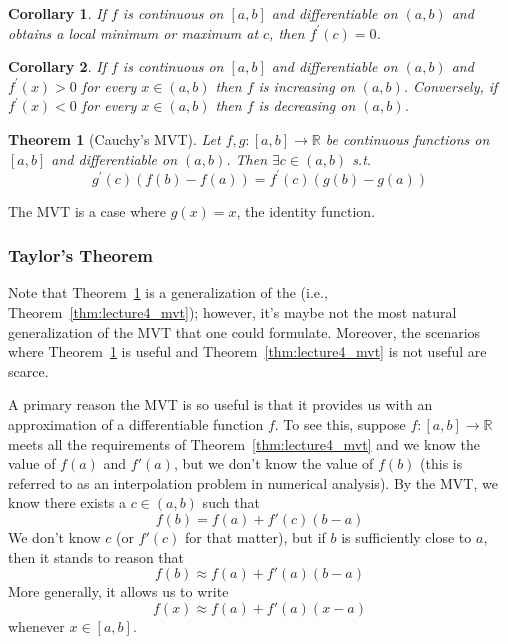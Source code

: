 \documentclass{article}
\newcommand{\R}{\mathbb{R}}
\theoremstyle{mythm}
\newtheorem{theorem}{Theorem}
\newtheorem{corollary}{Corollary}
\theoremstyle{mydef}
\begin{document}
\begin{corollary}
  If $f$ is continuous on $[a, b]$ and differentiable on $(a, b)$ and obtains a local minimum or maximum at $c$, then $f^\prime(c) = 0$.
\end{corollary}

\begin{corollary}
  If $f$ is continuous on $[a, b]$ and differentiable on $(a, b)$ and $f^\prime(x) > 0$ for every $x \in (a, b)$ then $f$ is increasing on $(a, b)$. Conversely, if $f^\prime(x) < 0$ for every $x \in (a, b)$ then $f$ is decreasing on $(a, b)$.
\end{corollary}

\begin{theorem}[Cauchy's MVT]\label{thm:cauchy_mvt}
  Let $f, g: [a, b] \to \mathbb{R}$ be continuous functions on $[a, b]$ and differentiable on $(a, b)$. Then $\exists c \in (a, b)$ s.t.
  \[
    g^\prime(c) \left(f(b) - f(a)\right)
    =
    f^\prime(c) \left(g(b) - g(a)\right)
  \]
\end{theorem}

The MVT is a case where $g(x) = x$, the identity function.

\subsubsection{Taylor's Theorem}
Note that Theorem~\ref{thm:cauchy_mvt} is a generalization of the  (i.e., Theorem~\ref{thm:lecture4_mvt}); however, it's maybe not the most natural generalization of the MVT that one could formulate. Moreover, the scenarios where Theorem~\ref{thm:cauchy_mvt} is useful and Theorem~\ref{thm:lecture4_mvt} is not useful are scarce. 

A primary reason the MVT is so useful is that it provides us with an approximation of a differentiable function $f$. To see this, suppose $f:[a,b]\to\R$ meets all the requirements of Theorem~\ref{thm:lecture4_mvt} and we know the value of $f(a)$ and $f'(a)$, but we don't know the value of $f(b)$ (this is referred to as an interpolation problem in numerical analysis). By the MVT, we know there exists a $c\in (a,b)$ such that 
\begin{equation*}
    f(b) = f(a) + f'(c)(b-a)
\end{equation*}
We don't know $c$ (or $f'(c)$ for that matter), but if $b$ is sufficiently close to $a$, then it stands to reason that 
\begin{equation*}
    f(b) \approx f(a) + f'(a)(b-a)
\end{equation*}
More generally, it allows us to write 
\begin{equation*}
    f(x) \approx f(a) + f'(a)(x-a)
\end{equation*}
whenever $x\in [a,b]$.
\end{document}
